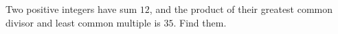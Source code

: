 Two positive integers have sum $12$, and the product of their greatest common divisor and least common multiple is $35$. Find them.
